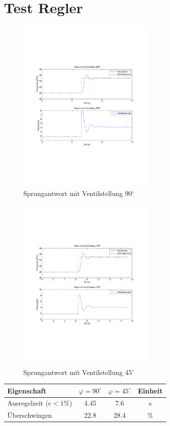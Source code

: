 \section{Test Regler}
\begin{figure}[h!]
    \centering
    \includegraphics[width=0.6\textwidth]{09/pi_siso_full_plot.pdf}
    \caption{Sprungantwort mit Ventilstellung 90$^\circ$}
    \label{fig:09a}
\end{figure}
\begin{figure}[h!]
    \centering
    \includegraphics[width=0.6\textwidth]{09/pi_siso_half_plot.pdf}
    \caption{Sprungantwort mit Ventilstellung 45$^\circ$}
    \label{fig:09b}
\end{figure}
\begin{table}[h!]
	\centering
	\begin{tabular}{l c c c}
		Eigenschaft
			& $\varphi = 90^\circ$
			& $\varphi = 45^\circ$ 
			& Einheit\\
		\hline
		Ausregelzeit ($e < 1\%$)
			& 4.45
			& 7.6
            & $\si{\second}$ \\
		Überschwingen
			& 22.8
			& 28.4
			& $\%$
	\end{tabular}
\end{table}
